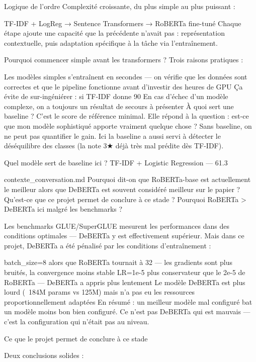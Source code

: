 Logique de l'ordre
Complexité croissante, du plus simple au plus puissant :


TF-IDF + LogReg  →  Sentence Transformers  →  RoBERTa fine-tuné
Chaque étape ajoute une capacité que la précédente n'avait pas : représentation contextuelle, puis adaptation spécifique à la tâche via l'entraînement.

Pourquoi commencer simple avant les transformers ?
Trois raisons pratiques :

Les modèles simples s'entraînent en secondes — on vérifie que les données sont correctes et que le pipeline fonctionne avant d'investir des heures de GPU
Ça évite de sur-ingéniérer : si TF-IDF donne 90%
En cas d'échec d'un modèle complexe, on a toujours un résultat de secours à présenter
À quoi sert une baseline ?
C'est le score de référence minimal. Elle répond à la question : est-ce que mon modèle sophistiqué apporte vraiment quelque chose ? Sans baseline, on ne peut pas quantifier le gain. Ici la baseline a aussi servi à détecter le déséquilibre des classes (la note 3★ déjà très mal prédite dès TF-IDF).

Quel modèle sert de baseline ici ?
TF-IDF + Logistic Regression — 61.3%

contexte_conversation.md
Pourquoi dit-on que RoBERTa-base est actuellement le meilleur alors que DeBERTa est souvent considéré meilleur sur le papier ?
Qu’est-ce que ce projet permet de conclure à ce stade ?
Pourquoi RoBERTa > DeBERTa ici malgré les benchmarks ?

Les benchmarks GLUE/SuperGLUE mesurent les performances dans des conditions optimales — DeBERTa y est effectivement supérieur. Mais dans ce projet, DeBERTa a été pénalisé par les conditions d'entraînement :

batch_size=8 alors que RoBERTa tournait à 32 — les gradients sont plus bruités, la convergence moins stable
LR=1e-5 plus conservateur que le 2e-5 de RoBERTa — DeBERTa a appris plus lentement
Le modèle DeBERTa est plus lourd (~184M params vs 125M) mais n'a pas eu les ressources proportionnellement adaptées
En résumé : un meilleur modèle mal configuré bat un modèle moins bon bien configuré. Ce n'est pas DeBERTa qui est mauvais — c'est la configuration qui n'était pas au niveau.

Ce que le projet permet de conclure à ce stade

Deux conclusions solides :

